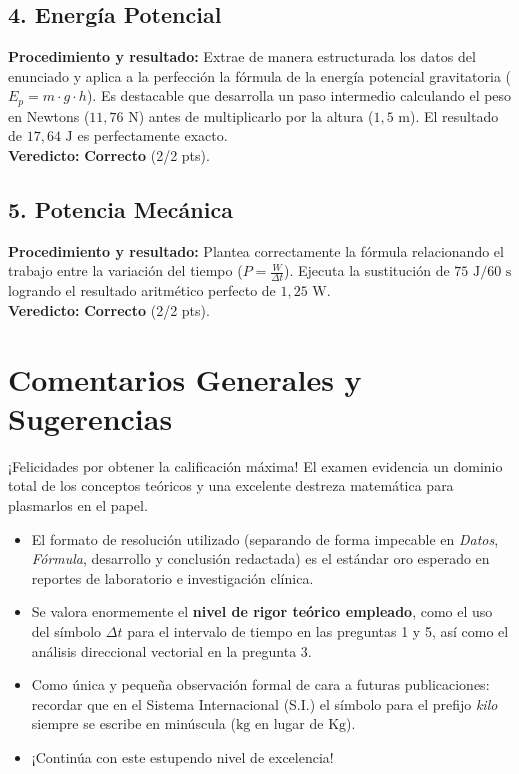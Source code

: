 \documentclass[12pt,letterpaper]{article}
\begin{document}
\subsection*{4. Energía Potencial}
\textbf{Procedimiento y resultado:} Extrae de manera estructurada los datos del enunciado y aplica a la perfección la fórmula de la energía potencial gravitatoria ($E_p = m \cdot g \cdot h$). Es destacable que desarrolla un paso intermedio calculando el peso en Newtons ($11,76 \text{ N}$) antes de multiplicarlo por la altura ($1,5 \text{ m}$). El resultado de $17,64 \text{ J}$ es perfectamente exacto. \\
\textbf{Veredicto:} \textbf{Correcto} (2/2 pts).

\subsection*{5. Potencia Mecánica}
\textbf{Procedimiento y resultado:} Plantea correctamente la fórmula relacionando el trabajo entre la variación del tiempo ($P = \frac{W}{\Delta t}$). Ejecuta la sustitución de $75 \text{ J} / 60 \text{ s}$ logrando el resultado aritmético perfecto de $1,25 \text{ W}$. \\
\textbf{Veredicto:} \textbf{Correcto} (2/2 pts).

\vspace{0.5cm}
\section*{Comentarios Generales y Sugerencias}
¡Felicidades por obtener la calificación máxima! El examen evidencia un dominio total de los conceptos teóricos y una excelente destreza matemática para plasmarlos en el papel.
\begin{itemize}
    \item El formato de resolución utilizado (separando de forma impecable en \textit{Datos}, \textit{Fórmula}, desarrollo y conclusión redactada) es el estándar oro esperado en reportes de laboratorio e investigación clínica.
    \item Se valora enormemente el \textbf{nivel de rigor teórico empleado}, como el uso del símbolo $\Delta t$ para el intervalo de tiempo en las preguntas 1 y 5, así como el análisis direccional vectorial en la pregunta 3.
    \item Como única y pequeña observación formal de cara a futuras publicaciones: recordar que en el Sistema Internacional (S.I.) el símbolo para el prefijo \textit{kilo} siempre se escribe en minúscula ($\text{kg}$ en lugar de $\text{Kg}$).
    \item ¡Continúa con este estupendo nivel de excelencia!
\end{itemize}
\end{document}
